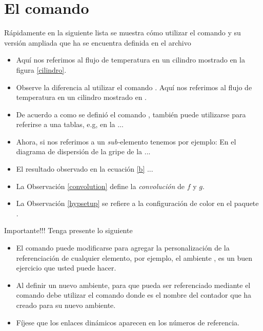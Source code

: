 \documentclass{article}
\begin{document}
\section{El comando }

Rápidamente en la siguiente lista se muestra cómo utilizar el comando  y su versión ampliada  que ha se encuentra definida en el archivo 

\begin{itemize}
	\item Aquí nos referimos al flujo de temperatura en un cilindro mostrado en la figura \ref{cilindro}.
	\item Observe la diferencia al utilizar el comando . Aquí nos referimos al flujo de temperatura en un cilindro mostrado en .
	\item De acuerdo a como se definió el comando , también puede utilizarse para referirse a una tablas, e.g, en la ...
	\item Ahora, si nos referimos a un \emph{sub-}elemento tenemos por ejemplo: En el diagrama de dispersión de la gripe de la  ...
	\item El resultado observado en la ecuación \eqref{b} ...
	\item La Observación \ref{convolution} define la \emph{convolución} de $f$ y $g$.
	\item La Observación \ref{hypsetup} se refiere a la configuración de color en el paquete .
\end{itemize}

\begin{remark}{Importante!!!}
Tenga presente lo siguiente
\begin{itemize}
	\item El comando  puede modificarse para agregar la personalización de la referenciación de cualquier elemento, por ejemplo, el ambiente , es un buen ejercicio que usted puede hacer.
	\item Al definir un nuevo ambiente, para que pueda ser referenciado mediante el comando  debe utilizar el comando \texttt{} donde  es el nombre del contador que ha creado para su nuevo ambiente.
	\item Fíjese que los enlaces dinámicos aparecen en los números de referencia.
\end{itemize}
\end{remark}
\end{document}
